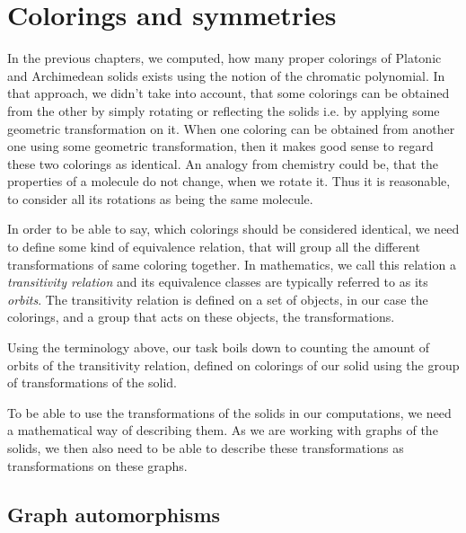 \chapter{Colorings and symmetries}

In the previous chapters, we computed, how many proper colorings of Platonic and Archimedean solids exists using the notion of the chromatic polynomial. In that approach, we didn't take into account, that some colorings can be obtained from the other by simply rotating or reflecting the solids i.e. by applying some geometric transformation on it. When one coloring can be obtained from another one using some geometric transformation, then it makes good sense to regard these two colorings as identical. An analogy from chemistry could be, that the properties of a molecule do not change, when we rotate it. Thus it is reasonable, to consider all its rotations as being the same molecule. 

In order to be able to say, which colorings should be considered identical, we need to define some kind of equivalence relation, that will group all the different transformations of same coloring together. In mathematics, we call this relation a \textit{transitivity relation} and its equivalence classes are typically referred to as its \textit{orbits}. The transitivity relation is defined on a set of objects, in our case the colorings, and a group that acts on these objects, the transformations.

Using the terminology above, our task boils down to counting the amount of orbits of the transitivity relation, defined on colorings of our solid using the group of transformations of the solid.

To be able to use the transformations of the solids in our computations, we need a mathematical way of describing them. As we are working with graphs of the solids, we then also need to be able to describe these transformations as transformations on these graphs.

\section{Graph automorphisms}

